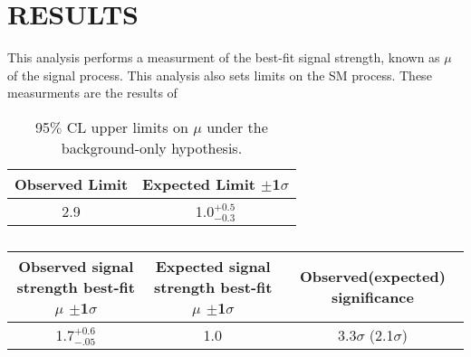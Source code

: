 %
%

\chapter{RESULTS}
This analysis performs a measurment of the best-fit signal strength, known as $\mu$ of the \tth signal process. This analysis also sets limits
on the SM \tth process. These measurments are the results of 



\begin{table}[htbp]
\begin{center}
  \caption[Table of Final Limits]{95$\%$ CL upper limits on $\mu$ under the background-only hypothesis.}
    \begin{tabular}{c c} \hline
      Observed Limit & Expected Limit $\pm$1$\sigma$  \\ \hline 
      2.9 & 1.0$^{+0.5}_{-0.3}$  \\
      \hline
    \end{tabular}
    \label{tab:limits}
\end{center}
\end{table}

\begin{table}[htbp]
\begin{center}
  \caption[Table of Signal Strength]{}
    \begin{tabular}{c c c} \hline
      Observed signal strength best-fit $\mu$ $\pm$1$\sigma$ & Expected signal strength best-fit $\mu$ $\pm$1$\sigma$ & Observed(expected) significance & \\ \hline 
      1.7$^{+0.6}_{-.05}$ & 1.0$^{}_{}$ & 3.3$\sigma$ (2.1$\sigma$)  \\
      \hline
    \end{tabular}
    \label{tab:mu}
\end{center}
\end{table}

